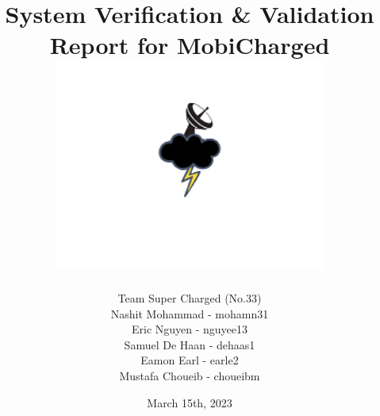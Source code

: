 \documentclass[12pt, titlepage]{article}
\begin{document}
\title{
    System Verification \& Validation Report for MobiCharged\\
    \includegraphics[width=9cm]{images/mobicharged.png} 
}
\author{Team Super Charged (No.33)
		\\ Nashit Mohammad - mohamn31
		\\ Eric Nguyen - nguyee13
		\\ Samuel De Haan - dehaas1
		\\ Eamon Earl - earle2
		\\ Mustafa Choueib - choueibm
}
    

\date{March 15th, 2023}


\maketitle

\tableofcontents
\listoffigures
\listoftables

\vspace{20pt}


\newpage

\end{document}
